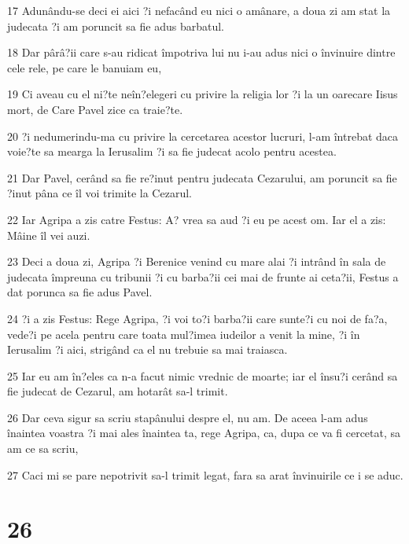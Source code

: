 \par 17 Adunându-se deci ei aici ?i nefacând eu nici o amânare, a doua zi am stat la judecata ?i am poruncit sa fie adus barbatul.
\par 18 Dar pârâ?ii care s-au ridicat împotriva lui nu i-au adus nici o învinuire dintre cele rele, pe care le banuiam eu,
\par 19 Ci aveau cu el ni?te neîn?elegeri cu privire la religia lor ?i la un oarecare Iisus mort, de Care Pavel zice ca traie?te.
\par 20 ?i nedumerindu-ma cu privire la cercetarea acestor lucruri, l-am întrebat daca voie?te sa mearga la Ierusalim ?i sa fie judecat acolo pentru acestea.
\par 21 Dar Pavel, cerând sa fie re?inut pentru judecata Cezarului, am poruncit sa fie ?inut pâna ce îl voi trimite la Cezarul.
\par 22 Iar Agripa a zis catre Festus: A? vrea sa aud ?i eu pe acest om. Iar el a zis: Mâine îl vei auzi.
\par 23 Deci a doua zi, Agripa ?i Berenice venind cu mare alai ?i intrând în sala de judecata împreuna cu tribunii ?i cu barba?ii cei mai de frunte ai ceta?ii, Festus a dat porunca sa fie adus Pavel.
\par 24 ?i a zis Festus: Rege Agripa, ?i voi to?i barba?ii care sunte?i cu noi de fa?a, vede?i pe acela pentru care toata mul?imea iudeilor a venit la mine, ?i în Ierusalim ?i aici, strigând ca el nu trebuie sa mai traiasca.
\par 25 Iar eu am în?eles ca n-a facut nimic vrednic de moarte; iar el însu?i cerând sa fie judecat de Cezarul, am hotarât sa-l trimit.
\par 26 Dar ceva sigur sa scriu stapânului despre el, nu am. De aceea l-am adus înaintea voastra ?i mai ales înaintea ta, rege Agripa, ca, dupa ce va fi cercetat, sa am ce sa scriu,
\par 27 Caci mi se pare nepotrivit sa-l trimit legat, fara sa arat învinuirile ce i se aduc.

\chapter{26}

